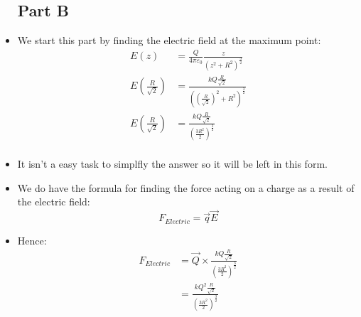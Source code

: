 \documentclass[12pt]{article}
\begin{document}
\begin{itemize}
\subsection{Part B}
\item We start this part by finding the electric field at the maximum point:
\begin{align*}
E(z)&=\frac{Q}{4 \pi \varepsilon_0}\frac{z}{(z^2+R^2)^{\frac{3}{2}}} \\
E \left ( \frac{R}{\sqrt{2}} \right )&=\frac{kQ  \frac{R}{\sqrt{2}}}{ \left ( \left(\frac{R}{\sqrt{2}} \right)^2+R^2 \right)^{\frac{3}{2}}} \\
E \left ( \frac{R}{\sqrt{2}} \right )&=\frac{kQ  \frac{R}{\sqrt{2}}}{ \left( \frac{3R^2}{2} \right)^{\frac{3}{2}}} \\
\end{align*}
\item It isn't a easy task to simplfly the answer so it will be left in this form.
\item We do have the formula for finding the force acting on a charge as a result of the electric field:
\begin{displaymath}
F_{Electric}=\vec{q}\vec{E}
\end{displaymath}
\item Hence:
\begin{align*}
F_{Electric}&=\vec{Q}\times \frac{kQ  \frac{R}{\sqrt{2}}}{ \left( \frac{3R^2}{2} \right)^{\frac{3}{2}}} \\
&= \frac{kQ^2  \frac{R}{\sqrt{2}}}{ \left( \frac{3R^2}{2} \right)^{\frac{3}{2}}} \\
\end{align*}
\pagebreak

\end{itemize}
\end{document}
